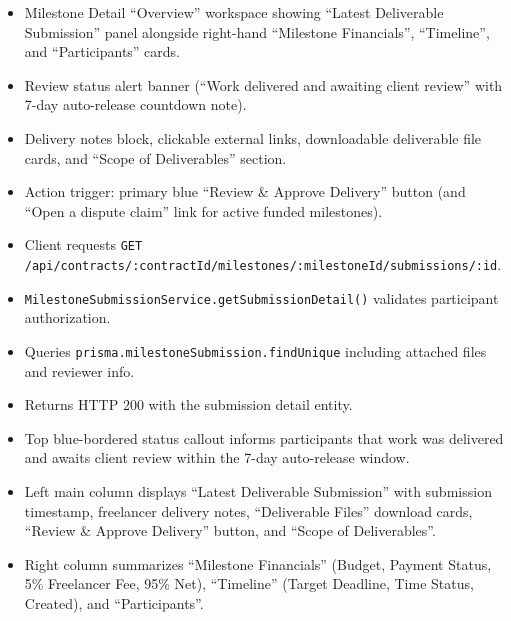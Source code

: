 \begin{itemize}[leftmargin=1.6em,topsep=3pt,itemsep=2pt,parsep=0pt,label=$\bullet$]
      \item Milestone Detail ``Overview'' workspace showing ``Latest Deliverable Submission'' panel alongside right-hand ``Milestone Financials'', ``Timeline'', and ``Participants'' cards.
      \item Review status alert banner (``Work delivered and awaiting client review'' with 7-day auto-release countdown note).
      \item Delivery notes block, clickable external links, downloadable deliverable file cards, and ``Scope of Deliverables'' section.
      \item Action trigger: primary blue ``Review \& Approve Delivery'' button (and ``Open a dispute claim'' link for active funded milestones).
\end{itemize}

\begin{itemize}[leftmargin=1.6em,topsep=3pt,itemsep=2pt,parsep=0pt,label=$\bullet$]
      \item Client requests \texttt{GET /\allowbreak{}api/\allowbreak{}contracts/\allowbreak{}:\allowbreak{}contractId/\allowbreak{}milestones/\allowbreak{}:\allowbreak{}milestoneId/\allowbreak{}submissions/\allowbreak{}:\allowbreak{}id}.
      \item \texttt{Milestone\allowbreak{}Submission\allowbreak{}Service.\allowbreak{}get\allowbreak{}Submission\allowbreak{}Detail()} validates participant authorization.
      \item Queries \texttt{prisma.\allowbreak{}milestone\allowbreak{}Submission.\allowbreak{}findUnique} including attached files and reviewer info.
      \item Returns HTTP 200 with the submission detail entity.
\end{itemize}

\begin{itemize}[leftmargin=1.6em,topsep=3pt,itemsep=2pt,parsep=0pt,label=$\bullet$]
      \item Top blue-bordered status callout informs participants that work was delivered and awaits client review within the 7-day auto-release window.
      \item Left main column displays ``Latest Deliverable Submission'' with submission timestamp, freelancer delivery notes, ``Deliverable Files'' download cards, ``Review \& Approve Delivery'' button, and ``Scope of Deliverables''.
      \item Right column summarizes ``Milestone Financials'' (Budget, Payment Status, 5\% Freelancer Fee, 95\% Net), ``Timeline'' (Target Deadline, Time Status, Created), and ``Participants''.
\end{itemize}

